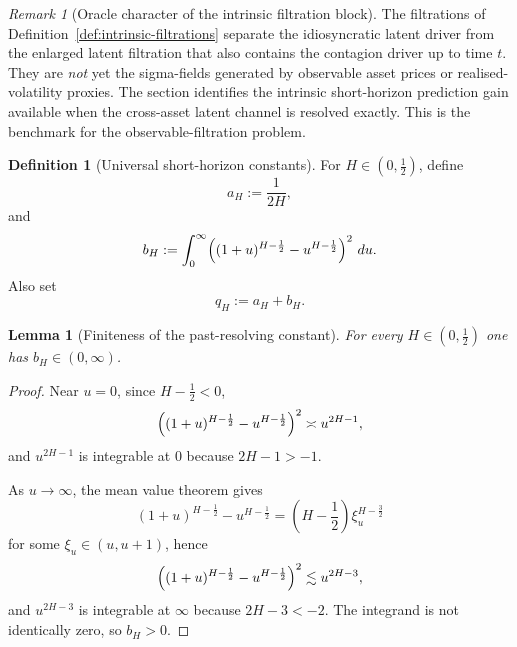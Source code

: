 \documentclass[11pt,a4paper]{amsart}
\theoremstyle{plain}
\newtheorem{lemma}[theorem]{Lemma}
\theoremstyle{definition}
\newtheorem{definition}[theorem]{Definition}
\theoremstyle{remark}
\newtheorem{remark}[theorem]{Remark}
\newcommand{\dd}{\,d}
\begin{document}
\begin{remark}[Oracle character of the intrinsic filtration block]
The filtrations of Definition~\ref{def:intrinsic-filtrations} separate the idiosyncratic latent
driver from the enlarged latent filtration that also contains the contagion driver up to time $t$.
They are \emph{not} yet the sigma-fields generated by observable asset prices or
realised-volatility proxies.  The section identifies the intrinsic short-horizon prediction gain
available when the cross-asset latent channel is resolved exactly.  This is the benchmark for the
observable-filtration problem.
\end{remark}

\begin{definition}[Universal short-horizon constants]\label{def:constants}
For $H\in(0,\tfrac12)$, define
\begin{equation}\label{eq:aH}
a_H:=\frac{1}{2H},
\end{equation}
and
\begin{equation}\label{eq:bH}
b_H
:=
\int_0^\infty \Bigl((1+u)^{H-\frac12}-u^{H-\frac12}\Bigr)^2\,\dd u.
\end{equation}
Also set
\begin{equation}\label{eq:qH}
q_H:=a_H+b_H.
\end{equation}
\end{definition}

\begin{lemma}[Finiteness of the past-resolving constant]\label{lem:bH}
For every $H\in(0,\tfrac12)$ one has $b_H\in(0,\infty)$.
\end{lemma}

\begin{proof}
Near $u=0$, since $H-\tfrac12<0$,
\[
\Bigl((1+u)^{H-\frac12}-u^{H-\frac12}\Bigr)^2
\asymp
u^{2H-1},
\]
and $u^{2H-1}$ is integrable at $0$ because $2H-1>-1$.

As $u\to\infty$, the mean value theorem gives
\[
(1+u)^{H-\frac12}-u^{H-\frac12}
=
\left(H-\frac12\right)\xi_u^{H-\frac32}
\]
for some $\xi_u\in(u,u+1)$, hence
\[
\Bigl((1+u)^{H-\frac12}-u^{H-\frac12}\Bigr)^2
\lesssim
u^{2H-3},
\]
and $u^{2H-3}$ is integrable at $\infty$ because $2H-3<-2$.
The integrand is not identically zero, so $b_H>0$.
\end{proof}
\end{document}
